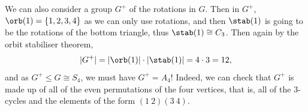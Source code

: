 \documentclass[a4paper]{scrartcl}
\begin{document}
We can also consider a group $G^+$ of the rotations in $G$. Then in $G^+$, $\orb(1) = \{1, 2, 3, 4\}$ as we can only use rotations, and then $\stab(1)$ is going to be the rotations of the bottom triangle, thus $\stab(1) \cong C_3$. Then again by the orbit stabiliser theorem,
$$
|G^+| = |\orb(1)| \cdot |\stab(1)| = 4 \cdot 3 = 12,
$$
and as $G^+ \leq G \cong S_4$, we must have $G^+ = A_4$!
Indeed, we can check that $G^+$ is made up of all of the even permutations of the four vertices, that is, all of the 3-cycles and the elements of the form $(1\ 2)(3\ 4)$. 
\begin{center}
	


\begin{tikzpicture}[x=0.75pt,y=0.75pt,yscale=-1,xscale=1]


\end{tikzpicture}
\end{center}
\end{document}
